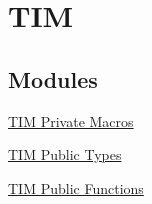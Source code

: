 \hypertarget{group___t_i_m}{\section{\-T\-I\-M}
\label{group___t_i_m}
}
\subsection*{\-Modules}
\begin{DoxyCompactItemize}
\item 
\hyperlink{group___t_i_m___private___macros}{\-T\-I\-M Private Macros}
\item 
\hyperlink{group___t_i_m___public___types}{\-T\-I\-M Public Types}
\item 
\hyperlink{group___t_i_m___public___functions}{\-T\-I\-M Public Functions}
\end{DoxyCompactItemize}
